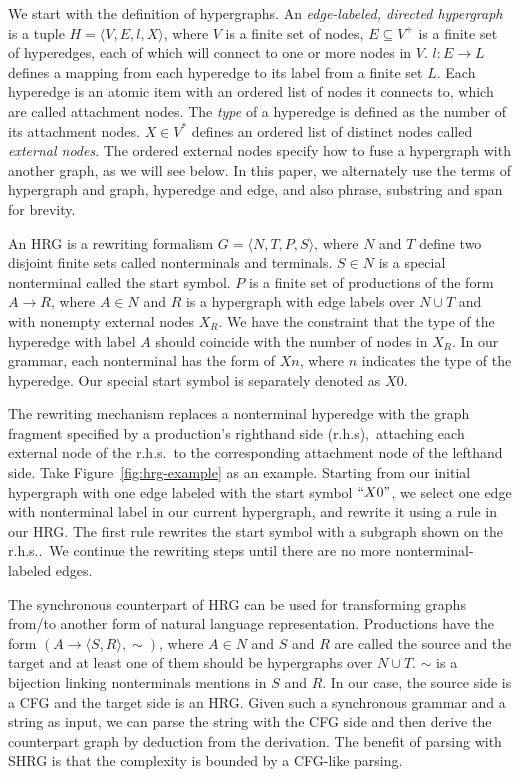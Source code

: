 We start with the definition of hypergraphs. An {\em edge-labeled, directed hypergraph} is a tuple $H=\langle V,E,l,X\rangle$, where $V$ is a finite set of nodes, $E\subseteq V^+$ is
a finite set of hyperedges, each of which will connect to one or more nodes in $V$. $l: E\to L$ defines a mapping from each 
hyperedge to its label from a finite set $L$. Each hyperedge is an atomic item with an ordered list of nodes it connects to, which 
are called attachment nodes. The {\em type} of a hyperedge
is defined as the number of its attachment nodes.  $X\in V^*$ defines an ordered list of distinct nodes called
{\em external nodes}. 
The ordered external nodes specify how to fuse a
hypergraph with another graph, as we will see below.
In this paper, we alternately use the terms of 
hypergraph and graph, hyperedge and edge, and also phrase, substring and span for brevity.


An HRG is a rewriting formalism $G=\langle N,T,P,S \rangle$, where $N$ and $T$ define two disjoint finite sets called nonterminals 
and terminals. $S\in N$ is a special nonterminal
called the start symbol. $P$ is a finite set of productions of the form $A\to R$, where $A\in N$ and $R$ is a 
hypergraph with edge labels over $N\cup T$ and with nonempty external nodes $X_R$. We have the constraint that the type of the
hyperedge with label $A$ should coincide with the number of nodes in $X_R$. In our grammar, each nonterminal
has the form of $Xn$, where $n$ indicates the type of the hyperedge. Our special start symbol is separately denoted as $X0$.


The rewriting mechanism replaces a nonterminal 
hyperedge with the graph fragment specified by a production's
righthand side (r.h.s),\ attaching each external node of the 
r.h.s.\ to the corresponding attachment node of the lefthand side.
Take Figure~\ref{fig:hrg-example} as an example. 
Starting from our initial hypergraph with one edge 
labeled with the start symbol $``X0"$, we select one edge with nonterminal label in our current hypergraph, 
and rewrite it using a rule in our HRG\@. The first rule rewrites
the start symbol with a subgraph shown on the r.h.s..\ We continue the rewriting steps 
until there are no more nonterminal-labeled edges. 


The synchronous counterpart of HRG can be used for transforming graphs from/to another form of natural language representation. 
Productions have the form $(A\to \langle S, R\rangle , \sim)$, where $A \in N$ and $S$ and $R$ are called the source and the target and at least one of them should be
hypergraphs over $N\cup T$. $\sim$ is a bijection linking nonterminals mentions in $S$ and $R$.
In our case, the source side is a CFG and the target side is an HRG\@. Given such a synchronous grammar and a string as input, we can 
parse the string with the CFG side and then derive the counterpart graph by deduction from the derivation. The benefit of 
parsing with SHRG is that the complexity is bounded by a CFG-like parsing.

